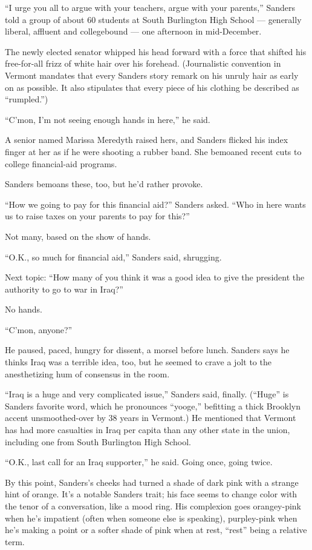 ``I urge you all to argue with your teachers, argue with your parents,''
Sanders told a group of about 60 students at South Burlington High
School --- generally liberal, affluent and collegebound --- one
afternoon in mid-December.

The newly elected senator whipped his head forward with a force that
shifted his free-for-all frizz of white hair over his forehead.
(Journalistic convention in Vermont mandates that every Sanders story
remark on his unruly hair as early on as possible. It also stipulates
that every piece of his clothing be described as ``rumpled.'')

``C'mon, I'm not seeing enough hands in here,'' he said.

A senior named Marissa Meredyth raised hers, and Sanders flicked his
index finger at her as if he were shooting a rubber band. She bemoaned
recent cuts to college financial-aid programs.

Sanders bemoans these, too, but he'd rather provoke.

``How we going to pay for this financial aid?'' Sanders asked. ``Who in
here wants us to raise taxes on your parents to pay for this?''

Not many, based on the show of hands.

``O.K., so much for financial aid,'' Sanders said, shrugging.

Next topic: ``How many of you think it was a good idea to give the
president the authority to go to war in Iraq?''

No hands.

``C'mon, anyone?''

He paused, paced, hungry for dissent, a morsel before lunch. Sanders
says he thinks Iraq was a terrible idea, too, but he seemed to crave a
jolt to the anesthetizing hum of consensus in the room.

``Iraq is a huge and very complicated issue,'' Sanders said, finally.
(``Huge'' is Sanders favorite word, which he pronounces ``yooge,''
befitting a thick Brooklyn accent unsmoothed-over by 38 years in
Vermont.) He mentioned that Vermont has had more casualties in Iraq per
capita than any other state in the union, including one from South
Burlington High School.

``O.K., last call for an Iraq supporter,'' he said. Going once, going
twice.

By this point, Sanders's cheeks had turned a shade of dark pink with a
strange hint of orange. It's a notable Sanders trait; his face seems to
change color with the tenor of a conversation, like a mood ring. His
complexion goes orangey-pink when he's impatient (often when someone
else is speaking), purpley-pink when he's making a point or a softer
shade of pink when at rest, ``rest'' being a relative term.

